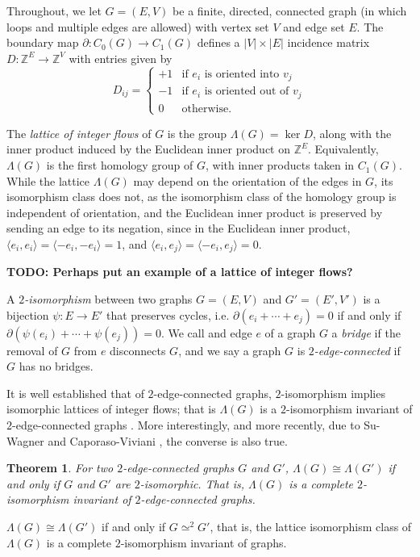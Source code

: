 \documentclass[12pt]{report}
\newcommand{\Z}{\mathbb{Z}}
\newcommand{\ip}[2]{\langle #1, #2 \rangle}
\newcommand{\notegreen}[1]{{\color{Green} \textbf{#1}}}
\newtheorem*{theorem}{Theorem}
\begin{document}
Throughout, we let $G = (E, V)$ be a finite, directed, connected graph (in which loops and multiple edges are allowed) with vertex set $V$ and edge set $E$. The boundary map $\partial:  C_{0}(G) \longrightarrow C_{1}(G)$ defines a $|V|\times|E|$ incidence matrix $D : \Z^{E} \longrightarrow \Z^{V}$ with entries given by
\[D_{ij} = \begin{cases}
	+1 & \text{if $e_{i}$ is oriented into $v_{j}$}   \\
	-1 & \text{if $e_{i}$ is oriented out of $v_{j}$} \\
	0  & \text{otherwise.}
\end{cases}\]

The \textit{lattice of integer flows} of $G$ is the group $\Lambda(G) = \ker D$, along with the inner product induced by the Euclidean inner product on $\Z^{E}$. Equivalently, $\Lambda(G)$ is the first homology group of $G$, with inner products taken in $C_{1}(G)$. While the lattice $\Lambda(G)$ may depend on the orientation of the edges in $G$, its isomorphism class does not, as the isomorphism class of the homology group is independent of orientation, and the Euclidean inner product is preserved by sending an edge to its negation, since in the Euclidean inner product, $\ip{e_{i}}{e_{i}} =  \ip{-e_{i}}{-e_{i}} = 1$, and $\ip{e_{i}}{e_{j}} = \ip{-e_{i}}{e_{j}} = 0$.

\notegreen{TODO: Perhaps put an example of a lattice of integer flows?}

A \textit{$2$-isomorphism} between two graphs $G = (E, V)$ and $G' = (E', V')$ is a bijection \({\psi: E \longrightarrow E'}\) that preserves cycles, i.e. $\partial(e_{i} + \cdots + e_{j}) = 0$ if and only if $\partial\left(\psi(e_{i}) + \cdots + \psi(e_{j})\right) = 0$. We call and edge $e$ of a graph $G$ a \textit{bridge} if the removal of $G$ from $e$ disconnects $G$, and we say a graph $G$ is \textit{$2$-edge-connected} if $G$ has no bridges.

It is well established that of $2$-edge-connected graphs, $2$-isomorphism implies isomorphic lattices of integer flows; that is $\Lambda(G)$ is a $2$-isomorphism invariant of $2$-edge-connected graphs \parencite{lattice-of-flows-cuts}. More interestingly, and more recently, due to Su-Wagner \cite[Theorem 1]{lattice-of-flows-regular-matroid} and Caporaso-Viviani \cite[Theorem 3.1.1]{torelli-for-graphs-tropical-curves}, the converse is also true.


\begin{theorem}
For two $2$-edge-connected graphs $G$ and $G'$, $\Lambda(G) \cong \Lambda(G')$ if and only if $G$ and $G'$ are $2$-isomorphic. That is, $\Lambda(G)$ is a complete $2$-isomorphism invariant of $2$-edge-connected graphs.
\end{theorem} $\Lambda(G) \cong \Lambda(G')$ if and only if $G \simeq^{2} G'$, that is, the lattice isomorphism class of $\Lambda(G)$ is a complete $2$-isomorphism invariant of graphs.
\end{document}
